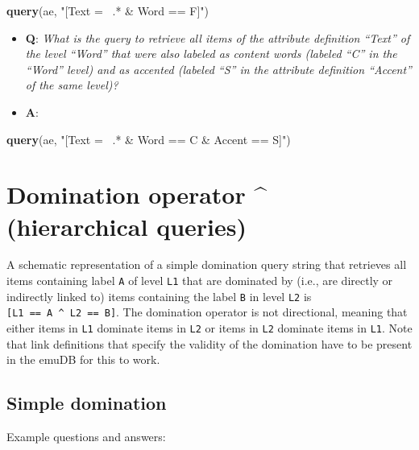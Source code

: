 \documentclass[]{book}
\newenvironment{Shaded}{\begin{snugshade}}{\end{snugshade}}
\newcommand{\KeywordTok}[1]{\textcolor[rgb]{0.13,0.29,0.53}{\textbf{#1}}}
\newcommand{\NormalTok}[1]{#1}
\newcommand{\StringTok}[1]{\textcolor[rgb]{0.31,0.60,0.02}{#1}}
\providecommand{\tightlist}{%
  \setlength{\itemsep}{0pt}\setlength{\parskip}{0pt}}
\theoremstyle{definition}
\theoremstyle{definition}
\theoremstyle{definition}
\theoremstyle{remark}
\begin{document}
\begin{Shaded}
\begin{Highlighting}[]
\KeywordTok{query}\NormalTok{(ae, }\StringTok{"[Text =~ .* & Word == F]"}\NormalTok{)}
\end{Highlighting}
\end{Shaded}

\begin{itemize}
\tightlist
\item
  \textbf{Q}: \emph{What is the query to retrieve all items of the
  attribute definition ``Text'' of the level ``Word'' that were also
  labeled as content words (labeled ``C'' in the ``Word'' level) and as
  accented (labeled ``S'' in the attribute definition ``Accent'' of the
  same level)?}
\item
  \textbf{A}:
\end{itemize}

\begin{Shaded}
\begin{Highlighting}[]
\KeywordTok{query}\NormalTok{(ae, }\StringTok{"[Text =~ .* & Word == C & Accent == S]"}\NormalTok{)}
\end{Highlighting}
\end{Shaded}

\hypertarget{domination-operator-hierarchical-queries}{%
\section{Domination operator \^{} (hierarchical
queries)}\label{domination-operator-hierarchical-queries}}

A schematic representation of a simple domination query string that
retrieves all items containing label \texttt{A} of level \texttt{L1}
that are dominated by (i.e., are directly or indirectly linked to) items
containing the label \texttt{B} in level \texttt{L2} is
\texttt{{[}L1\ ==\ A\ \^{}\ L2\ ==\ B{]}}. The domination operator is
not directional, meaning that either items in \texttt{L1} dominate items
in \texttt{L2} or items in \texttt{L2} dominate items in \texttt{L1}.
Note that link definitions that specify the validity of the domination
have to be present in the emuDB for this to work.

\hypertarget{simple-domination}{%
\subsection{Simple domination}\label{simple-domination}}

Example questions and answers:
\end{document}
